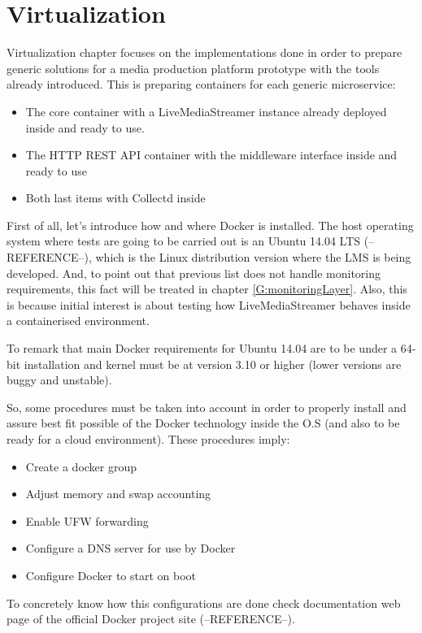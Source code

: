 \chapter{Virtualization}\label{D:virtualization}

Virtualization chapter focuses on the implementations done in order to prepare generic solutions for a media production platform prototype with the tools already introduced. This is preparing containers for each generic microservice:

\begin{itemize}
\item The core container with a LiveMediaStreamer instance already deployed inside and ready to use.
\item The HTTP REST API container with the middleware interface inside and ready to use
\item Both last items with Collectd inside
\end{itemize}

First of all, let's introduce how and where Docker is installed. The host operating system where tests are going to be carried out is an Ubuntu 14.04 LTS (--REFERENCE--), which is the Linux distribution version where the LMS is being developed. And, to point out that previous list does not handle monitoring requirements, this fact will be treated in chapter \ref{G:monitoringLayer}. Also, this is because initial interest is about testing how LiveMediaStreamer behaves inside a containerised environment.

To remark that main Docker requirements for Ubuntu 14.04 are to be under a 64-bit installation and kernel must be at version 3.10 or higher (lower versions are buggy and unstable). 

So, some procedures must be taken into account in order to properly install and assure best fit possible of the Docker technology inside the O.S (and also to be ready for a cloud environment). These procedures imply:

\begin{itemize}
\item Create a docker group
\item Adjust memory and swap accounting
\item Enable UFW forwarding
\item Configure a DNS server for use by Docker
\item Configure Docker to start on boot
\end{itemize}

To concretely know how this configurations are done check documentation web page of the official Docker project site (--REFERENCE--).

